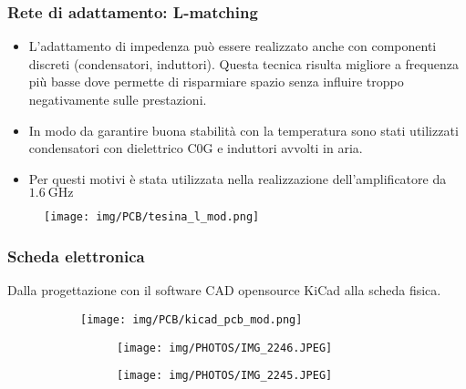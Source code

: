 \documentclass{beamer}
\begin{document}
\begin{frame}
    \frametitle{Rete di adattamento: L-matching}
    \begin{itemize}
        \item<1-> L'adattamento di impedenza può essere realizzato anche con componenti discreti (condensatori, induttori). Questa tecnica risulta migliore a frequenza più basse dove permette di risparmiare spazio senza influire troppo negativamente sulle prestazioni.
        \item<2-> In modo da garantire buona stabilità con la temperatura sono stati utilizzati condensatori con dielettrico C0G e induttori avvolti in aria.
        \item<3-> Per questi motivi è stata utilizzata nella realizzazione dell'amplificatore da $\SI{1.6}{\giga\hertz}$
    \end{itemize}
    
    \begin{figure}[]
        \centering
        \texttt{[image: img/PCB/tesina\_l\_mod.png]}
    \end{figure}

\end{frame}




\begin{frame}
    \frametitle{Scheda elettronica}
    Dalla progettazione con il software CAD opensource KiCad alla scheda fisica.
    \begin{figure}
        \centering
        \begin{subfigure}[t]{0.8\textwidth}
            \centering  
            \texttt{[image: img/PCB/kicad\_pcb\_mod.png]}
        \end{subfigure}

        \hfill

        \begin{subfigure}[b]{0.02\textheight}
            \centering
            
        \end{subfigure}

        \hfill
        
        \begin{subfigure}[b]{\textwidth}
            \centering
            \begin{subfigure}[l]{0.3\textwidth}
                \centering
                \texttt{[image: img/PHOTOS/IMG\_2246.JPEG]}
                
            \end{subfigure}
            \vspace{10pt}
            \begin{subfigure}[r]{0.3\textwidth}
                \centering
                \texttt{[image: img/PHOTOS/IMG\_2245.JPEG]}
                
            \end{subfigure}
        \end{subfigure}
    \end{figure}
\end{frame}
\end{document}
